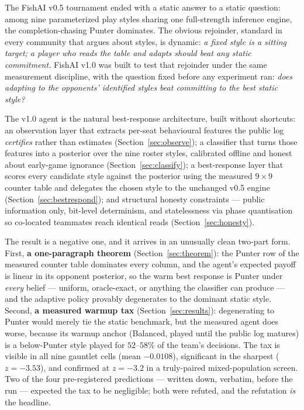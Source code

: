 \documentclass[11pt]{article}
\begin{document}
The FishAI v0.5 tournament \cite{v05paper} ended with a static answer to a static
question: among nine parameterized play styles sharing one full-strength inference engine,
the completion-chasing Punter dominates. The obvious rejoinder, standard in every
community that argues about styles, is dynamic: \emph{a fixed style is a sitting target; a
player who reads the table and adapts should beat any static commitment.} FishAI v1.0 was
built to test that rejoinder under the same measurement discipline, with the question
fixed before any experiment ran: \emph{does adapting to the opponents' identified styles
beat committing to the best static style?}

The v1.0 agent is the natural best-response architecture, built without shortcuts: an
observation layer that extracts per-seat behavioural features the public log \emph{certifies}
rather than estimates (Section~\ref{sec:observe}); a classifier that turns those features
into a posterior over the nine roster styles, calibrated offline and honest about early-game
ignorance (Section~\ref{sec:classify}); a best-response layer that scores every candidate
style against the posterior using the measured $9 \times 9$ counter table and delegates the
chosen style to the unchanged v0.5 engine (Section~\ref{sec:bestrespond}); and structural
honesty constraints --- public information only, bit-level determinism, and statelessness
via phase quantisation so co-located teammates reach identical reads
(Section~\ref{sec:honesty}).

The result is a negative one, and it arrives in an unusually clean two-part form. First,
\textbf{a one-paragraph theorem} (Section~\ref{sec:theorem}): the Punter row of the
measured counter table dominates every column, and the agent's expected payoff is linear
in its opponent posterior, so the warm best response is Punter under \emph{every} belief
--- uniform, oracle-exact, or anything the classifier can produce --- and the adaptive
policy provably degenerates to the dominant static style. Second, \textbf{a measured
warmup tax} (Section~\ref{sec:results}): degenerating to Punter would merely tie the
static benchmark, but the measured agent does worse, because its warmup anchor (Balanced,
played until the public log matures) is a below-Punter style played for $52$--$58\%$ of
the team's decisions. The tax is visible in all nine gauntlet cells (mean $-0.0108$),
significant in the sharpest ($z = -3.53$), and confirmed at $z = -3.2$ in a truly-paired
mixed-population screen. Two of the four pre-registered predictions --- written down,
verbatim, before the run --- expected the tax to be negligible; both were refuted, and
the refutation \emph{is} the headline.
\end{document}
